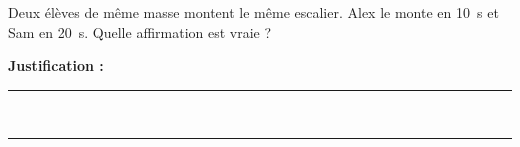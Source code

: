 Deux élèves de même masse montent le même escalier. Alex le monte en \qty{10}{s} et Sam en \qty{20}{s}. Quelle affirmation est vraie ?

\choices

\noindent\textbf{Justification :} \hrulefill \\[2.5ex]
\rule{\linewidth}{0.4pt} \\[2.5ex]
\rule{\linewidth}{0.4pt}
\vfill
